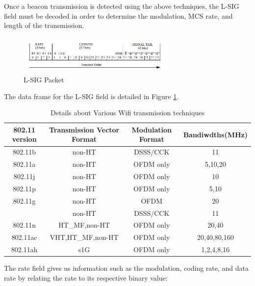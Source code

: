 Once a beacon transmission is detected using the above techniques, the L-SIG field must be decoded in order to determine the modulation, MCS rate, and length of the transmission.
\begin{figure}[ht!]
	\centering
	\includegraphics[width=0.70\textwidth]{img/lsig_packet}
	\caption{L-SIG Packet}
	\label{fig:lsig_packet}
\end{figure}\par
 The data frame for the L-SIG field is detailed in Figure \ref{fig:lsig_packet}.
\begin{table}[ht!]
	\centering
	\begin{tabular}{|c|c|c|c|}
		\hline
		802.11 version & Transmission Vector Format & Modulation Format & Bandiwdths(MHz) \\
		\hline
		802.11b & non-HT & DSSS/CCK & 11 \\
		802.11a & non-HT & OFDM only & 5,10,20 \\
		802.11j & non-HT & OFDM only & 10 \\
		802.11p & non-HT & OFDM only& 5,10 \\
		802.11g & non-HT & OFDM& 20 \\
			    & non-HT & DSSS/CCK& 11 \\
		802.11n & HT\_MF,non-HT & OFDM only & 20,40 \\
		802.11ac & VHT,HT\_MF,non-HT & OFDM only & 20,40,80,160 \\
		802.11ah & s1G & OFDM only & 1,2,4,8,16 \\
		\hline
	\end{tabular}
	\caption{Details about Various Wifi transmission techniques}
	\label{table:wifi_table}
\end{table} \par
The rate field gives us information such as the modulation, coding rate, and data rate by relating the rate to its respective binary value:


